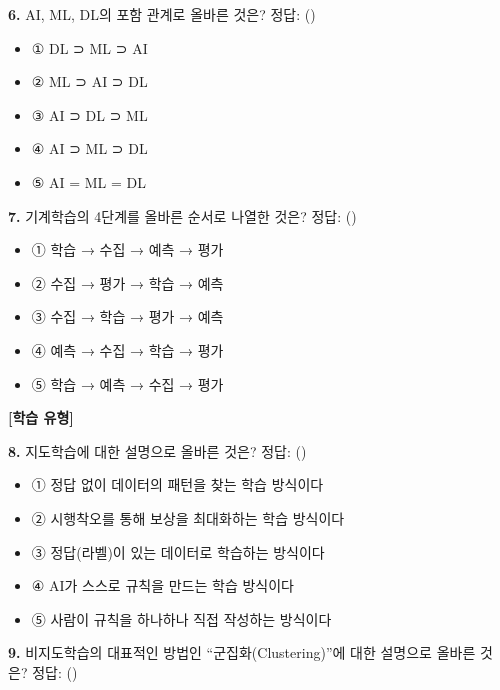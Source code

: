 \documentclass[11pt,a4paper]{article}
\begin{document}
\bigskip

\noindent\textbf{6.} AI, ML, DL의 포함 관계로 올바른 것은? \hfill 정답: (\hspace{1.5cm})

\begin{itemize}[leftmargin=2em, label={}]
    \item ① DL ⊃ ML ⊃ AI
    \item ② ML ⊃ AI ⊃ DL
    \item ③ AI ⊃ DL ⊃ ML
    \item ④ AI ⊃ ML ⊃ DL
    \item ⑤ AI = ML = DL
\end{itemize}

\bigskip

\noindent\textbf{7.} 기계학습의 4단계를 올바른 순서로 나열한 것은? \hfill 정답: (\hspace{1.5cm})

\begin{itemize}[leftmargin=2em, label={}]
    \item ① 학습 → 수집 → 예측 → 평가
    \item ② 수집 → 평가 → 학습 → 예측
    \item ③ 수집 → 학습 → 평가 → 예측
    \item ④ 예측 → 수집 → 학습 → 평가
    \item ⑤ 학습 → 예측 → 수집 → 평가
\end{itemize}

\bigskip

\noindent\textbf{[학습 유형]}

\bigskip

\noindent\textbf{8.} 지도학습에 대한 설명으로 올바른 것은? \hfill 정답: (\hspace{1.5cm})

\begin{itemize}[leftmargin=2em, label={}]
    \item ① 정답 없이 데이터의 패턴을 찾는 학습 방식이다
    \item ② 시행착오를 통해 보상을 최대화하는 학습 방식이다
    \item ③ 정답(라벨)이 있는 데이터로 학습하는 방식이다
    \item ④ AI가 스스로 규칙을 만드는 학습 방식이다
    \item ⑤ 사람이 규칙을 하나하나 직접 작성하는 방식이다
\end{itemize}

\bigskip

\noindent\textbf{9.} 비지도학습의 대표적인 방법인 ``군집화(Clustering)''에 대한 설명으로 올바른 것은? \hfill 정답: (\hspace{1.5cm})
\end{document}
